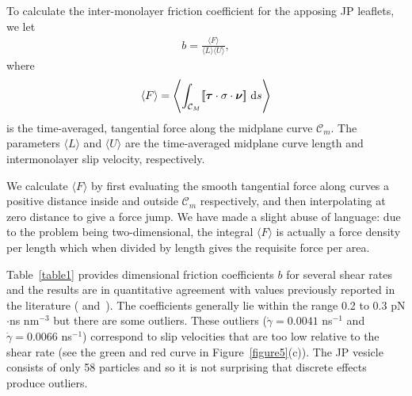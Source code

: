 \documentclass[lineno]{jfm}
\newcommand{\nnu}{\boldsymbol{\nu}}
\newcommand{\ttau}{\boldsymbol{\tau}}
\newcommand{\jump}[1]{[\![ #1 ]\!]}
\begin{document}
To calculate the inter-monolayer friction coefficient for the apposing
JP leaflets, we let
\begin{align}
  b = \frac{\langle F\rangle}{\langle L \rangle \langle U\rangle},
\end{align}
%
where 
\begin{align}
  \langle F\rangle = \left\langle \int_{\mathcal{C}_M} 
    \jump{\ttau \cdot \sigma \cdot \nnu} \,\dif s \right\rangle
\end{align}
is the time-averaged, tangential force along the midplane curve
$\mathcal{C}_m$. The parameters $\langle L\rangle$ and $\langle
U\rangle$ are the time-averaged midplane curve length and intermonolayer
slip velocity, respectively.

We calculate $\langle F\rangle$ by first evaluating the smooth
tangential force along curves a positive distance inside and outside
$\mathcal{C}_m$ respectively, and then interpolating at zero distance to
give a force jump. We have made a slight abuse of language: due to the
problem being two-dimensional, the integral $\langle F\rangle$ is
actually a force density per length which when divided by length gives
the requisite force per area. 

Table~\ref{table1} provides dimensional friction coefficients $b$ for
several shear rates and the results are in quantitative agreement with
values previously reported in the literature (\cite{sch-vla-mik2010}
and~\cite{denOtter2007}). The coefficients generally lie within the
range 0.2 to 0.3 pN$\cdot$ns nm$^{-3}$ but there are some outliers.
These outliers ($\dot\gamma = 0.0041$ ns$^{-1}$ and $\dot\gamma =
0.0066$ ns$^{-1}$) correspond to slip velocities that are too low
relative to the shear rate (see the green and red curve in
Figure~\ref{figure5}(c)). The JP vesicle consists of only 58 particles
and so it is not surprising that discrete effects produce outliers.

%
\end{document}
